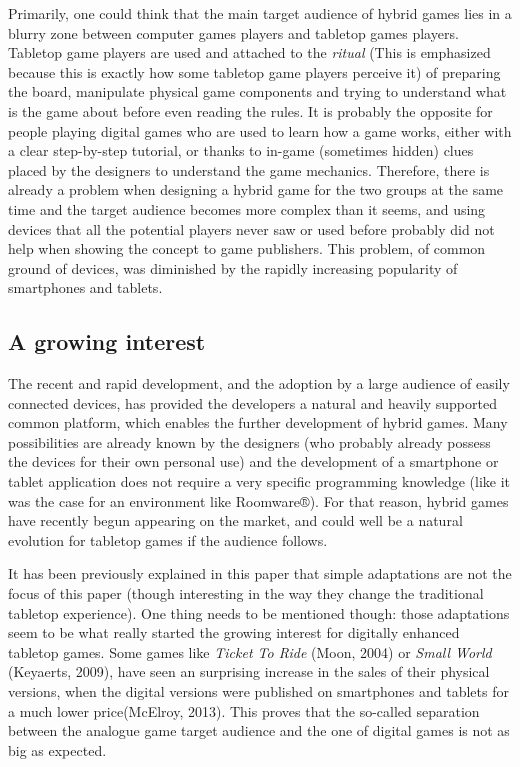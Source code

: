 Primarily, one could think that the main target audience of hybrid games lies in a blurry zone between computer games players and tabletop games players. Tabletop game players are used and attached to the \textit{ritual} (This is emphasized because this is exactly how some tabletop game players perceive it) of preparing the board, manipulate physical game components and trying to understand what is the game about before even reading the rules.
It is probably the opposite for people playing digital games who are used to learn how a game works, either with a clear step-by-step tutorial, or thanks to in-game (sometimes hidden) clues placed by the designers to understand the game mechanics. 
Therefore, there is already a problem when designing a hybrid game for the two groups at the same time and the target audience becomes more complex than it seems, and using devices that all the potential players never saw or used before probably did not help when showing the concept to game publishers. 
This problem, of common ground of devices, was diminished by the rapidly increasing popularity of smartphones and tablets.

\subsection{A growing interest}
The recent and rapid development, and the adoption by a large audience of easily connected devices, has provided the developers a natural and heavily supported common platform, which enables the further development of hybrid games. Many possibilities are already known by the designers (who probably already possess the devices for their own personal use) and the development of a smartphone or tablet application does not require a very specific programming knowledge (like it was the case for an environment like Roomware®). For that reason, hybrid games have recently begun appearing on the market, and could well be a natural evolution for tabletop games if the audience follows.

It has been previously explained in this paper that simple adaptations are not the focus of this paper (though interesting in the way they change the traditional tabletop experience). 
One thing needs to be mentioned though: those adaptations seem to be what really started the growing interest for digitally enhanced tabletop games. Some games like \textit{Ticket To Ride} (Moon, 2004)\cite{game:ticket} or \textit{Small World} (Keyaerts, 2009)\cite{game:tw}, have seen an surprising increase in the sales of their physical versions, when the digital versions were published on smartphones and tablets for a much lower price(McElroy, 2013)\cite{web:poly}. This proves that the so-called separation between the analogue game target audience and the one of digital games is not as big as expected.

